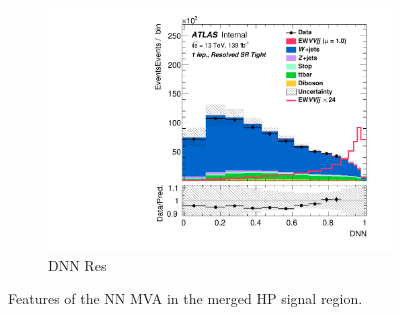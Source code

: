 \begin{figure}[ht]
\begin{subfigure}{0.3\textwidth}
        \includegraphics[width=\linewidth]{figures/1lep/altML/Region_distDNN_DSRVBSTight_BMin0_T0_Y6051_incTag1_J2_L1_incJet1_Prefit.pdf}
        \caption{DNN Res}
    \end{subfigure}
    \caption{Features of the NN MVA in the merged HP signal region.}
    \label{fig:1lepDNNoutputs}
\end{figure}








